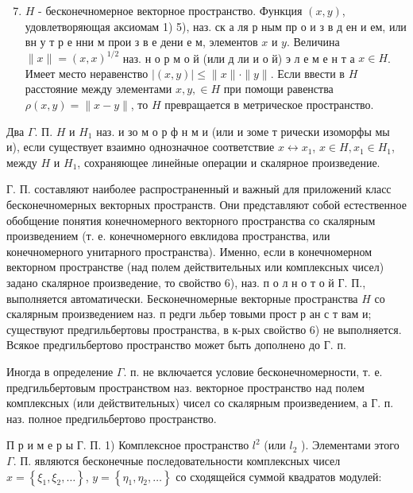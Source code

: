 \documentclass[10pt]{article}
\begin{document}
\begin{enumerate}

  \setcounter{enumi}{6}

  \item $H$ - бесконечномерное векторное пространство. Функция $(x, y)$, удовлетворяющая аксиомам 1) 5), наз. ск а ля р ным пр о и з в д ен и ем, или вн у т р е нни м прои з в е дени е м, элементов $x$ и $y$. Величина $\|x\|=(x, x)^{1 / 2}$ наз. н о р м о й (или д ли и о й) э л е м е н т а $x \in H$. Имеет место неравенство $|(x, y)| \leqslant\|x\| \cdot\|y\|$. Если ввести в $H$ расстояние между элементами $x, y, \in H$ при помощи равенства $\rho(x, y)=\|x-y\|$, то $H$ превращается в метрическое пространство.

\end{enumerate}



Два $\Gamma$. П. $H$ и $H_{1}$ наз. и зо м о р ф н м и (или и зоме т рически изоморфы мы и), если существует взаимно однозначное соответствие $x \leftrightarrow x_{1}$, $x \in H, x_{1} \in H_{1}$, между $H$ и $H_{1}$, сохраняющее линейные операции и скалярное произведение.



Г. П. составляют наиболее распространенный и важный для приложений класс бесконечномерных векторных пространств. Они представляют собой естественное обобщение понятия конечномерного векторного пространства со скалярным произведением (т. е. конечномерного евклидова пространства, или конечномерного унитарного пространства). Именно, если в конечномерном векторном пространстве (над полем действительных или комплексных чисел) задано скалярное произведение, то свойство 6), наз. п о л н о т о й Г. П., выполняется автоматически. Бесконечномерные векторные пространства $H$ со скалярным произведением наз. п редги льбер товыми прост р ан с т вам и; существуют предгильбертовы пространства, в к-рых свойство 6) не выполняется. Всякое предгильбертово пространство может быть дополнено до $Г$. п.



Иногда в определение $\Gamma$. п. не включается условие бесконечномерности, т. е. предгильбертовым пространством наз. векторное пространство над полем комплексных (или действительных) чисел со скалярным произведением, а Г. п. наз. полное предгильбертово пространство.



П р и м е р ы Г. П. 1) Комплексное пространство $l^{2}$ (или $l_{2}$ ). Элементами этого $\Gamma$. П. являются бесконечные последовательности комплексных чисел $x=\left\{\xi_{1}, \xi_{2}, \ldots\right\}$, $y=\left\{\eta_{1}, \eta_{2}, \ldots\right\}$ со сходящейся суммой квадратов модулей:
\end{document}

